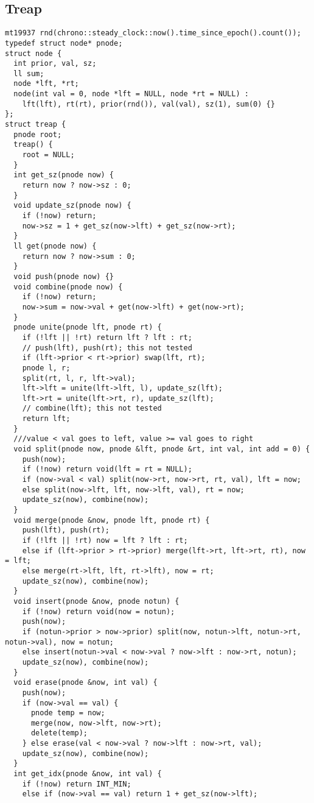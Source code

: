 \documentclass[10pt,a4paper,onesided]{article}
\begin{document}
\begin{multicols*}{3}
\subsection{Treap}
\begin{lstlisting}
mt19937 rnd(chrono::steady_clock::now().time_since_epoch().count());
typedef struct node* pnode;
struct node {
  int prior, val, sz;
  ll sum;
  node *lft, *rt;
  node(int val = 0, node *lft = NULL, node *rt = NULL) : 
    lft(lft), rt(rt), prior(rnd()), val(val), sz(1), sum(0) {}
};
struct treap {
  pnode root;
  treap() {
    root = NULL;
  }
  int get_sz(pnode now) {
    return now ? now->sz : 0;
  }
  void update_sz(pnode now) {
    if (!now) return;
    now->sz = 1 + get_sz(now->lft) + get_sz(now->rt);
  }
  ll get(pnode now) {
    return now ? now->sum : 0;
  }
  void push(pnode now) {}
  void combine(pnode now) {
    if (!now) return;
    now->sum = now->val + get(now->lft) + get(now->rt);
  }
  pnode unite(pnode lft, pnode rt) {
    if (!lft || !rt) return lft ? lft : rt;
    // push(lft), push(rt); this not tested
    if (lft->prior < rt->prior) swap(lft, rt);
    pnode l, r;
    split(rt, l, r, lft->val);
    lft->lft = unite(lft->lft, l), update_sz(lft);
    lft->rt = unite(lft->rt, r), update_sz(lft);
    // combine(lft); this not tested
    return lft;
  }
  ///value < val goes to left, value >= val goes to right
  void split(pnode now, pnode &lft, pnode &rt, int val, int add = 0) {
    push(now);
    if (!now) return void(lft = rt = NULL);
    if (now->val < val) split(now->rt, now->rt, rt, val), lft = now;
    else split(now->lft, lft, now->lft, val), rt = now;
    update_sz(now), combine(now);
  }
  void merge(pnode &now, pnode lft, pnode rt) {
    push(lft), push(rt);
    if (!lft || !rt) now = lft ? lft : rt;
    else if (lft->prior > rt->prior) merge(lft->rt, lft->rt, rt), now = lft;
    else merge(rt->lft, lft, rt->lft), now = rt;
    update_sz(now), combine(now);
  }
  void insert(pnode &now, pnode notun) {
    if (!now) return void(now = notun);
    push(now);
    if (notun->prior > now->prior) split(now, notun->lft, notun->rt, notun->val), now = notun;
    else insert(notun->val < now->val ? now->lft : now->rt, notun);
    update_sz(now), combine(now);
  }
  void erase(pnode &now, int val) {
    push(now);
    if (now->val == val) {
      pnode temp = now;
      merge(now, now->lft, now->rt);
      delete(temp);
    } else erase(val < now->val ? now->lft : now->rt, val);
    update_sz(now), combine(now);
  }
  int get_idx(pnode &now, int val) {
    if (!now) return INT_MIN;
    else if (now->val == val) return 1 + get_sz(now->lft);

\end{lstlisting}
\end{multicols*}
\end{document}
